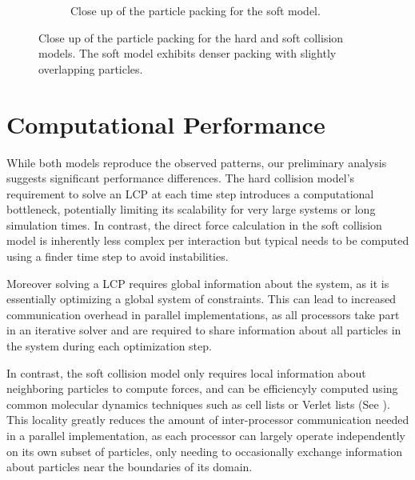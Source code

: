 \documentclass[conference]{IEEEtran}
\begin{document}
\begin{figure}
\begin{subfigure}[b]{0.49\columnwidth}
        \caption{Close up of the particle packing for the soft model.}
        \label{fig:tiger}
    \end{subfigure}
    \caption{Close up of the particle packing for the hard and soft collision models. The soft model exhibits denser packing with slightly overlapping particles.} \label{fig:dense_packing_comparison}
\end{figure}



\newpage

\section{Computational Performance}

While both models reproduce the observed patterns, our preliminary analysis suggests significant performance differences. The hard collision model's requirement to solve an LCP at each time step introduces a computational bottleneck, potentially limiting its scalability for very large systems or long simulation times. In contrast, the direct force calculation in the soft collision model is inherently less complex per interaction but typical needs to be computed using a finder time step to avoid instabilities.


Moreover solving a LCP requires global information about the system, as it is essentially optimizing a global system of constraints. This can lead to increased communication overhead in parallel implementations, as all processors take part in an iterative solver and are required to share information about all particles in the system during each optimization step.


In contrast, the soft collision model only requires local information about neighboring particles to compute forces, and can be efficiencyly computed using common molecular dynamics techniques such as cell lists or Verlet lists (See \cite{Gratl2019}). This locality greatly reduces the amount of inter-processor communication needed in a parallel implementation, as each processor can largely operate independently on its own subset of particles, only needing to occasionally exchange information about particles near the boundaries of its domain.
\end{document}
